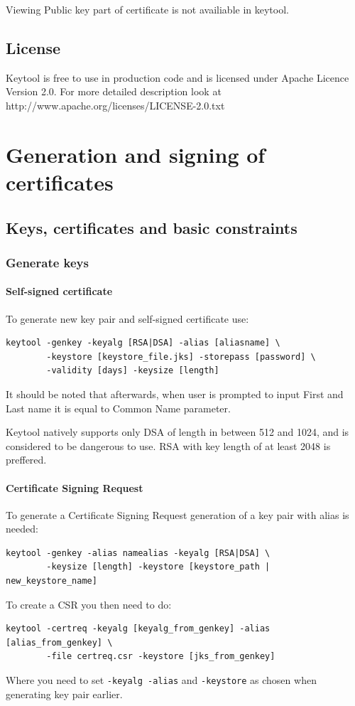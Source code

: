 \documentclass[10pt, a4paper]{report}
\begin{document}
Viewing Public key part of certificate is not availiable in keytool.

  \subsection{License}
Keytool is free to use in production code and is licensed under Apache Licence Version 2.0. For more detailed description look at http://www.apache.org/licenses/LICENSE-2.0.txt
  
\section{Generation and signing of certificates}

  \subsection{Keys, certificates and basic constraints}
  
    \subsubsection{Generate keys}
    
      \paragraph{Self-signed certificate}
To generate new key pair and self-signed certificate use:
\begin{verbatim}
keytool -genkey -keyalg [RSA|DSA] -alias [aliasname] \
        -keystore [keystore_file.jks] -storepass [password] \
        -validity [days] -keysize [length]
\end{verbatim}

It should be noted that afterwards, when user is prompted to input First and Last name it is equal to Common Name parameter.

Keytool natively supports only DSA of length in between 512 and 1024, and is considered to be dangerous to use. RSA with key length of at least 2048 is preffered.

      \paragraph{Certificate Signing Request}
To generate a Certificate Signing Request generation of a key pair with alias is needed:
\begin{verbatim}
keytool -genkey -alias namealias -keyalg [RSA|DSA] \
        -keysize [length] -keystore [keystore_path | new_keystore_name]
\end{verbatim}
To create a CSR you then need to do:
\begin{verbatim}
keytool -certreq -keyalg [keyalg_from_genkey] -alias [alias_from_genkey] \
        -file certreq.csr -keystore [jks_from_genkey]
\end{verbatim}
Where you need to set \verb+-keyalg -alias+ and \verb+-keystore+ as chosen when generating key pair earlier.
\end{document}
